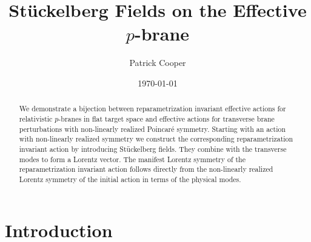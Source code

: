 \documentclass[%
 reprint,
 amsmath,amssymb,
 aps,
]{revtex4-1}
\begin{document}
\title{St\"uckelberg Fields on the Effective $p$-brane}

\author{Patrick Cooper}

\date{\today}

\begin{abstract}
We demonstrate a bijection between reparametrization invariant effective actions for relativistic $p$-branes
in flat target space and effective actions for transverse brane perturbations with non-linearly realized Poincar\'e symmetry.
Starting with an action with non-linearly realized symmetry we construct the corresponding reparametrization invariant action by introducing
St\"uckelberg fields. They combine with the transverse modes to form a Lorentz vector. The manifest Lorentz symmetry of the reparametrization invariant action
follows directly from the non-linearly realized Lorentz symmetry of the initial action in terms of the physical modes.
\end{abstract}

\maketitle


\section{\label{sec:level1}Introduction}
\end{document}
